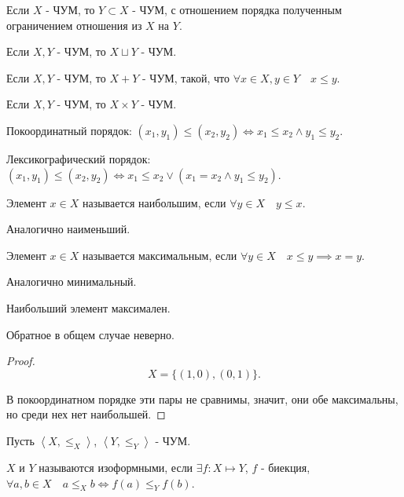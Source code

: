 \begin{lemma} \thmslashn

    Если $X$ - ЧУМ, то $Y \subset X$ - ЧУМ, с отношением порядка полученным ограничением отношения из $X$ на $Y$.

    Если $X, Y$ - ЧУМ, то $X \sqcup Y$ - ЧУМ.

    Если $X, Y$ - ЧУМ, то $X + Y$ - ЧУМ, такой, что $\forall{x\in X, y\in Y}\quad x \le  y$.

    Если $X, Y$ - ЧУМ, то $X \times Y$ - ЧУМ.

    Покоординатный порядок: $(x_1, y_1) \le (x_2, y_2) \iff x_1 \le x_2 \land y_1 \le y_2$.

    Лексикографический порядок: $(x_1, y_1) \le (x_2, y_2) \iff x_1 \le x_2 \lor (x_1 = x_2 \land y_1 \le y_2)$.
\end{lemma}
\begin{definition} \thmslashn 

    Элемент $x\in X$ называется наибольшим, если $\forall{y\in X}\quad y \le x$.

    Аналогично наименьший.
\end{definition}
\begin{definition} \thmslashn 

    Элемент $x\in X$ называется максимальным, если $\forall{y\in X}\quad x \le y \implies x = y$.

    Аналогично минимальный.
\end{definition}
\begin{statement} \thmslashn

    Наибольший элемент максимален.
\end{statement}
\begin{statement} \thmslashn

    Обратное в общем случае неверно.
    \begin{proof} \thmslashn
    
        \[ X = \{(1, 0), (0, 1)\}  .\]

        В покоординатном порядке эти пары не сравнимы, значит, они обе максимальны, но среди нех нет наибольшей.
    \end{proof}
\end{statement}
\begin{definition} \thmslashn 

    Пусть $\left<X, \le_{X}\right>$, $\left<Y, \le_{Y}\right>$ - ЧУМ.

    $X$ и $Y$ называются изоформными, если $\exists{f : X \mapsto Y}$, $f$ - биекция, $\forall{a, b\in X}\quad a \le_{X} b \iff f(a) \le_{Y} f(b)$.
\end{definition}
